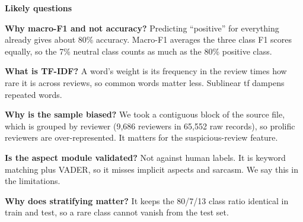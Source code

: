 \documentclass[10pt,a4paper]{article}
\begin{document}
\par\vspace{2pt}\textbf{Likely questions}\par\vspace{1pt}
\begin{qa}\textbf{Why macro-F1 and not accuracy?} Predicting ``positive'' for everything already gives about 80\% accuracy. Macro-F1 averages the three class F1 scores equally, so the 7\% neutral class counts as much as the 80\% positive class.\end{qa}\vspace{2pt}
\begin{qa}\textbf{What is TF-IDF?} A word's weight is its frequency in the review times how rare it is across reviews, so common words matter less. Sublinear tf dampens repeated words.\end{qa}\vspace{2pt}
\begin{qa}\textbf{Why is the sample biased?} We took a contiguous block of the source file, which is grouped by reviewer (9,686 reviewers in 65,552 raw records), so prolific reviewers are over-represented. It matters for the suspicious-review feature.\end{qa}\vspace{2pt}
\begin{qa}\textbf{Is the aspect module validated?} Not against human labels. It is keyword matching plus VADER, so it misses implicit aspects and sarcasm. We say this in the limitations.\end{qa}\vspace{2pt}
\begin{qa}\textbf{Why does stratifying matter?} It keeps the 80/7/13 class ratio identical in train and test, so a rare class cannot vanish from the test set.\end{qa}
\newpage
\end{document}
